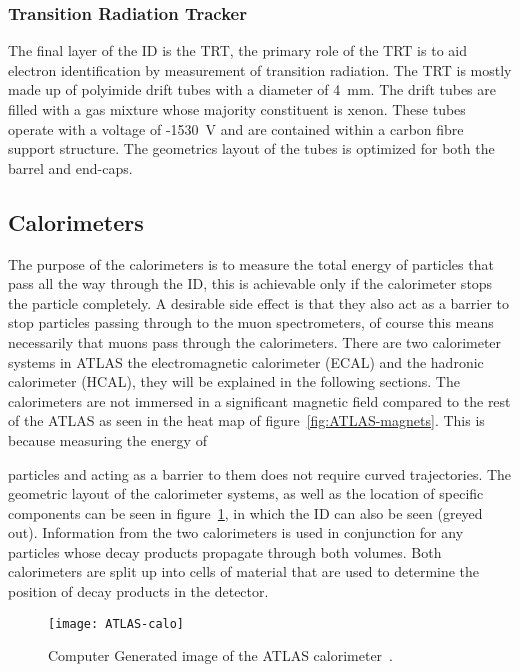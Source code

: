 \subsubsection{Transition Radiation Tracker}

The final layer of the ID is the TRT, the primary role of the TRT is to aid
electron identification by measurement of transition radiation. The TRT is
mostly made up of polyimide drift tubes with a diameter of 4~mm. The drift tubes
are filled with a gas mixture whose majority constituent is xenon. These tubes
operate with a voltage of -1530~V and are contained within a carbon fibre
support structure. The geometrics layout of the tubes is optimized for
both the barrel and end-caps.



\subsection{Calorimeters}%
\label{sec:calo}

The purpose of the calorimeters is to measure the total energy of particles that
pass all the way through the ID, this is achievable only if the calorimeter
stops the particle completely. A desirable side effect is that they also act as
a barrier to stop particles passing through to the muon spectrometers, of course
this means necessarily that muons pass through the calorimeters. There are two
calorimeter systems in ATLAS the electromagnetic calorimeter (ECAL) and the
hadronic calorimeter (HCAL), they will be explained in the following sections.
The calorimeters are not immersed in a significant magnetic field compared to
the rest of the ATLAS as seen in the heat map of figure~\ref{fig:ATLAS-magnets}.
This is because measuring the energy of

particles and acting as a barrier to them does not require curved trajectories.
The geometric layout of the calorimeter systems, as well as the location of
specific components can be seen in figure~\ref{fig:ATLAS-calo}, in which the ID
can also be seen (greyed out). Information from the two calorimeters is used in
conjunction for any particles whose decay products propagate through both
volumes. Both calorimeters are split up into cells of material that are used to
determine the position of decay products in the detector.
\begin{figure}[h]
  \centering
  \texttt{[image: ATLAS-calo]}
  \caption[ATLAS Calorimeter]{Computer Generated image of the ATLAS
    calorimeter~\cite{ATLAS-calo-fig}.}%
  \label{fig:ATLAS-calo}
\end{figure}

